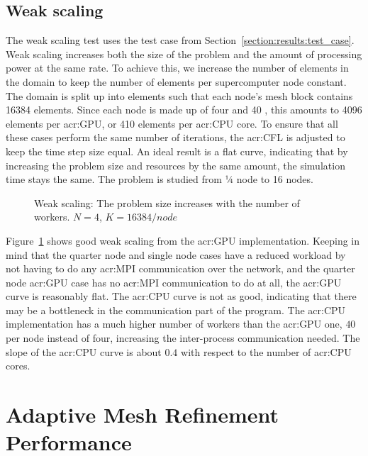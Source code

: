\subsection{Weak scaling}\label{subsection:results:scaling_tests:weak}

The weak scaling test uses the test case from Section~\ref{section:results:test_case}. Weak scaling
increases both the size of the problem and the amount of processing power at the same rate. To
achieve this, we increase the number of elements in the domain to keep the number of elements per
supercomputer node constant. The domain is split up into elements such that each node's mesh block
contains 16384 elements. Since each node is made up of four  and 40
, this amounts to 4096 elements per \acrshort{acr:GPU}, or 410 elements per
\acrshort{acr:CPU} core. To ensure that all these cases perform the same number of iterations, the
\acrshort{acr:CFL} is adjusted to keep the time step size equal. An ideal result is a flat curve,
indicating that by increasing the problem size and resources by the same amount, the simulation time
stays the same. The problem is studied from ¼ node to 16 nodes.

\begin{figure}[H]
    \centering
    
    \caption{Weak scaling: The problem size increases with the number of workers. \(N = 4\), \(K =
    16384/{node}\)}\label{fig:weak_scaling}
\end{figure}

Figure~\ref{fig:weak_scaling} shows good weak scaling from the \acrshort{acr:GPU} implementation.
Keeping in mind that the quarter node and single node cases have a reduced workload by not having to
do any \acrshort{acr:MPI} communication over the network, and the quarter node \acrshort{acr:GPU}
case has no \acrshort{acr:MPI} communication to do at all, the \acrshort{acr:GPU} curve is
reasonably flat. The \acrshort{acr:CPU} curve is not as good, indicating that there may be a
bottleneck in the communication part of the program. The \acrshort{acr:CPU} implementation has a
much higher number of workers than the \acrshort{acr:GPU} one, \(40\) per node instead of four,
increasing the inter-process communication needed. The slope of the \acrshort{acr:CPU} curve is
about \(0.4\) with respect to the number of \acrshort{acr:CPU} cores.

\section{Adaptive Mesh Refinement Performance}\label{section:results:adaptivity_performance}


